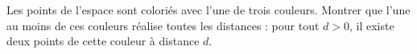 Les points de l'espace sont coloriés avec l'une de trois couleurs. Montrer que l'une au moins de ces couleurs réalise toutes les distances : pour tout $d > 0$, il existe deux points de cette couleur à distance $d$.
